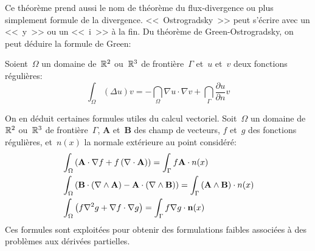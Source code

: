 \medskip
Ce théorème prend aussi le nom de théorème du flux-divergence ou plus simplement formule de la
divergence. <<~Ostrogradsky~>> peut s'écrire avec un <<~y~>> ou un <<~i~>> à la fin. Du théorème de Green-Ostrogradsky, on peut déduire la formule de Green:

\begin{theoreme}
Soient~$\Omega$ un domaine de~$\mathbb R^2$ ou~$\mathbb R^3$ de frontière~$\Gamma$
et~$u$ et~$v$ deux fonctions régulières:
\begin{equation}
\int_\Omega (\Delta u)v = -\dint_\Omega \nabla u\cdot\nabla v + \dint_\Gamma \dfrac{\partial u}{\partial n}v
\end{equation}
\end{theoreme}

\medskip
On en déduit certaines formules utiles du calcul vectoriel.
Soit~$\Omega$ un domaine de~$\mathbb R^2$ ou~$\mathbb R^3$ de frontière~$\Gamma$,
$\mathbf{A}$ et~$\mathbf{B}$ des champ de vecteurs, $f$ et~$g$ des
fonctions régulières, et~$n(x)$ la normale extérieure au point considéré:
\begin{align}
  &\int_\Omega \left( \mathbf{A}\cdot \nabla f + f \left(\nabla \cdot \mathbf{A}\right)\right)=
  \int_\Gamma f \mathbf{A}\cdot n(x)\\
&\int_\Omega \left( \mathbf{B}\cdot\left(\nabla \wedge \mathbf{A}\right) - \mathbf{A}\cdot \left(\nabla
\wedge \mathbf{B}\right) \right)
= \int_\Gamma \left(\mathbf{A} \wedge \mathbf{B}\right)\cdot n(x)\\
&\int_\Omega \left( f \nabla^{2} g + \nabla f \cdot \nabla g \right)
= \int_\Gamma f \nabla g \cdot \mathbf{n}(x)
\end{align}
Ces formules sont exploitées pour obtenir des formulations faibles associées à des problèmes aux dérivées partielles. 